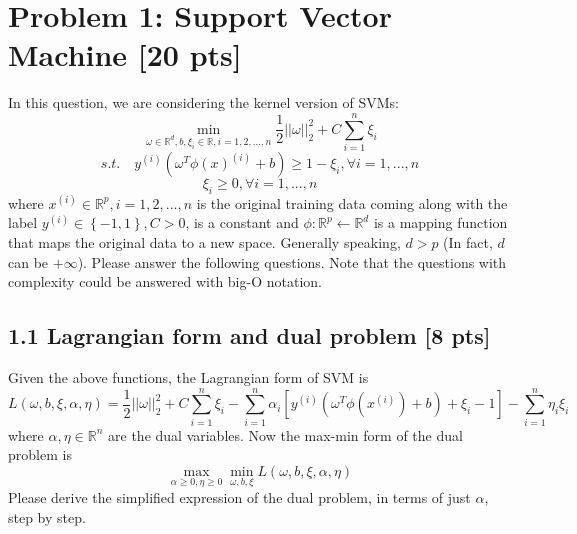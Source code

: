 \section*{Problem 1: Support Vector Machine [20 pts]}
In this question, we are considering the kernel version of SVMs:
$$ \min_{\omega \in \mathbb{R}^d, b, \xi_i \in \mathbb{R}, i=1,2,...,n} \frac{1}{2} ||\omega||^2_2 + C \sum_{i=1}^n \xi_i $$
 $$ s.t. \quad y^{(i)}(\omega^T \phi(x)^{(i)}+b) \geq  1- \xi_i, \forall i=1,...,n $$
$$\xi_i \geq 0, \forall i=1,...,n$$
where $x^{(i)} \in \mathbb{R}^p, i=1,2,...,n$ is the original training data coming along with the label $y^{(i)} \in \left\{-1,1\right\}, C>0$, is a constant and $\phi: \mathbb{R}^p \leftarrow \mathbb{R}^d$ is a mapping function that maps the original data to a new space. Generally speaking, $d>p$ (In fact, $d$ can be $+\infty$). Please answer the following questions. Note that the questions with complexity could be answered with big-O notation.
\subsection*{1.1 Lagrangian form and dual problem [8 pts]}
Given the above functions, the Lagrangian form of SVM is
$$ L(\omega,b, \xi, \alpha, \eta)=\frac{1}{2}||\omega||^2_2 + C \sum_{i=1}^n \xi_i- \sum_{i=1}^n \alpha_i[y^{(i)}(\omega^T\phi(x^{(i)})+b)+\xi_i-1]- \sum_{i=1}^n\eta_i \xi_i $$
where $\alpha, \eta \in \mathbb{R}^n$ are the dual variables.
Now the max-min form of the dual problem is
$$\max_{\alpha \geq 0, \eta \geq 0} \min_{\omega, b, \xi} L(\omega, b, \xi, \alpha, \eta)$$
Please derive the simplified expression of the dual problem, in terms of just $\alpha$, step by step. \\

\begin{soln}
\end{soln}

\pagebreak 


